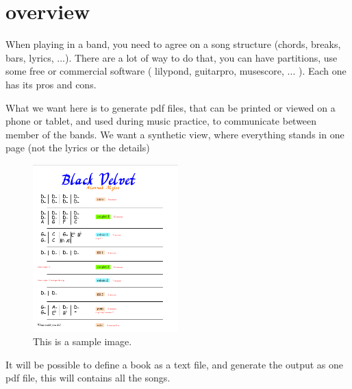 \documentclass[a4paper,12pt]{article}
\begin{document}

\tableofcontents

\section{overview}
When playing in a band, you need to agree on a song structure (chords, breaks, bars, lyrics, ...). There are a lot of way to do that, you can have
partitions, use some free or commercial software ( lilypond, guitarpro, musescore, ... ). Each one has its pros and cons.

What we want here is to generate pdf files, that can be printed or viewed on a phone or tablet, and used during music practice, to communicate
between member of the bands. We want a synthetic view, where everything stands in one page (not the lyrics or the details)

\begin{figure}[h]  %
	\centering  %
	\includegraphics[width=0.5\textwidth]{doc1}  %
	\caption{This is a sample image.}
	\label{fig:sample_image}  %
\end{figure}

\newpage




It will be possible to define a book as a text file, and generate the output as one pdf file, this will contains all the songs.


\end{document}
